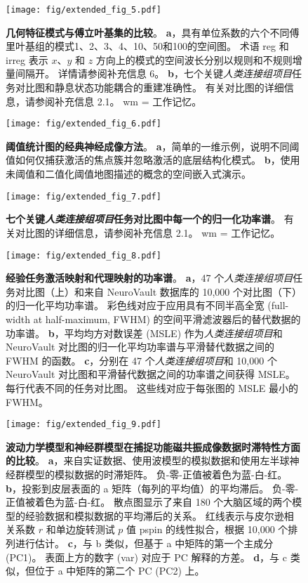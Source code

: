 \documentclass[lang=cn,a4paper,newtx]{elegantpaper}
\begin{document}
\begin{figure}[!htb] 
	\centering
	\texttt{[image: fig/extended\_fig\_5.pdf]}
	\caption{\textbf{几何特征模式与傅立叶基集的比较}。
	\textbf{a}，具有单位系数的六个不同傅里叶基组的模式1、2、3、4、10、50和100的空间图。
	术语 reg 和 irreg 表示 $ x $、$ y $ 和 $ z $ 方向上的模式的空间波长分别以规则和不规则增量间隔开。
	详情请参阅补充信息 6。
	\textbf{b}，七个关键\textit{人类连接组项目}任务对比图和静息状态功能耦合的重建准确性。
	有关对比图的详细信息，请参阅补充信息 2.1。
	wm = 工作记忆。}
	\label{fig:extended_fig_5}
\end{figure}


\begin{figure}[!htb] 
	\centering
	\texttt{[image: fig/extended\_fig\_6.pdf]}
	\caption{\textbf{阈值统计图的经典神经成像方法}。
	\textbf{a}，简单的一维示例，说明不同阈值如何仅捕获激活的焦点簇并忽略激活的底层结构化模式。
	\textbf{b}，使用未阈值和二值化阈值地图描述的概念的空间嵌入式演示。}
	\label{fig:extended_fig_6}
\end{figure}


\begin{figure}[!htb] 
	\centering
	\texttt{[image: fig/extended\_fig\_7.pdf]}
	\caption{\textbf{七个关键\textit{人类连接组项目}任务对比图中每一个的归一化功率谱}。
	有关对比图的详细信息，请参阅补充信息 2.1。
	wm = 工作记忆。}
	\label{fig:extended_fig_7}
\end{figure}


\begin{figure}[!htb] 
	\centering
	\texttt{[image: fig/extended\_fig\_8.pdf]}
	\caption{\textbf{经验任务激活映射和代理映射的功率谱}。
	\textbf{a}，47 个\textit{人类连接组项目}任务对比图（上）和来自 NeuroVault 数据库的 10,000 个对比图（下）的归一化平均功率谱。
	彩色线对应于应用具有不同半高全宽 (full-width at
	half-maximum, FWHM) 的空间平滑滤波器后的替代数据的功率谱。
	\textbf{b}，平均均方对数误差 (MSLE) 作为\textit{人类连接组项目}和 NeuroVault 对比图的归一化平均功率谱与平滑替代数据之间的 FWHM 的函数。
	\textbf{c}，分别在 47 个\textit{人类连接组项目}和 10,000 个 NeuroVault 对比图和平滑替代数据之间的功率谱之间获得 MSLE。
	每行代表不同的任务对比图。
	这些线对应于每张图的 MSLE 最小的 FWHM。}
	\label{fig:extended_fig_8}
\end{figure}


\begin{figure}[!htb] 
	\centering
	\texttt{[image: fig/extended\_fig\_9.pdf]}
	\caption{\textbf{波动力学模型和神经群模型在捕捉功能磁共振成像数据时滞特性方面的比较}。
	\textbf{a}，来自实证数据、使用波模型的模拟数据和使用左半球神经群模型的模拟数据的时滞矩阵。
	负-零-正值被着色为蓝-白-红。
	\textbf{b}，投影到皮层表面的 a 矩阵（每列的平均值）的平均滞后。
	负-零-正值被着色为蓝-白-红。
	散点图显示了来自 180 个大脑区域的两个模型的经验数据和模拟数据的平均滞后的关系。
	红线表示与皮尔逊相关系数 $ r $ 和单边旋转测试 $ p $ 值 pspin 的线性拟合，根据 10,000 个排列进行估计。 
	\textbf{c}，与 b 类似，但基于 a 中矩阵的第一个主成分 (PC1)。
	表面上方的数字 (var) 对应于 PC 解释的方差。
	\textbf{d}，与 c 类似，但位于 a 中矩阵的第二个 PC (PC2) 上。}
	\label{fig:extended_fig_9}
\end{figure}
\end{document}
